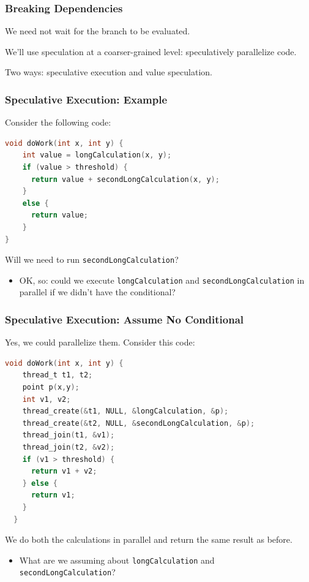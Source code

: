 \begin{frame}
\frametitle{Breaking Dependencies}

We need not wait for the branch to be evaluated.

We'll use speculation at a coarser-grained level: speculatively parallelize code.

Two ways: \alert{speculative execution} and
      \alert{value speculation}.
  
\end{frame}


\begin{frame}[fragile]
  \frametitle{Speculative Execution: Example}

  
Consider the following code:
  
  \begin{lstlisting}[language=C]
void doWork(int x, int y) {
    int value = longCalculation(x, y);
    if (value > threshold) {
      return value + secondLongCalculation(x, y);
    }
    else {
      return value;
    }
}
  \end{lstlisting}

  Will we need to run {\tt secondLongCalculation}?
  \vfill  
  \begin{itemize}
    \item<2> OK, so: could we execute {\tt longCalculation} and {\tt secondLongCalculation}
      in parallel if we didn't have the conditional?
  \end{itemize}
  
\end{frame}

\begin{frame}[fragile]
  \frametitle{Speculative Execution: Assume No Conditional}

  
  Yes, we could parallelize them. Consider this code:
    
    \begin{lstlisting}[language=C]
  void doWork(int x, int y) {
    thread_t t1, t2;
    point p(x,y);
    int v1, v2;
    thread_create(&t1, NULL, &longCalculation, &p);
    thread_create(&t2, NULL, &secondLongCalculation, &p);
    thread_join(t1, &v1);
    thread_join(t2, &v2);
    if (v1 > threshold) {
      return v1 + v2;
    } else {
      return v1;
    }
  }
    \end{lstlisting}

  We do both the calculations in parallel and return the same result as before.

  \begin{itemize}
    \item What are we assuming about {\tt longCalculation} and
{\tt secondLongCalculation}?
  \end{itemize}
  
\end{frame}

